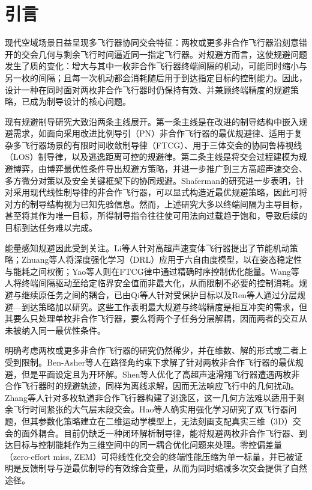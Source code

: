 \section{引言}
现代空域场景日益呈现多飞行器协同交会特征：两枚或更多非合作飞行器沿刻意错开的交会几何与剩余飞行时间逼近同一指定飞行器\cite{yan2020b,shalumov2019}。对规避方而言，这使规避问题发生了质的变化：增大与其中一枚非合作飞行器终端间隔的机动，可能同时缩小与另一枚的间隔；且每一次机动都会消耗随后用于到达指定目标的控制能力。因此，设计一种在同时面对两枚非合作飞行器时仍保持有效、并兼顾终端精度的规避策略，已成为制导设计的核心问题。

现有规避制导研究大致沿两条主线展开。第一条主线是在改进的制导结构中嵌入规避需求，如面向采用改进比例导引（PN）非合作飞行器的最优规避律\cite{feng2023}、适用于复杂多飞行器场景的有限时间收敛制导律（FTCG）\cite{ding2024}、用于三体交会的协同鲁棒视线（LOS）制导律\cite{luo2023}，以及逃逸距离可控的规避律\cite{yu2023}。第二条主线是将交会过程建模为规避博弈，由博弈最优性条件导出规避方策略\cite{turetsky2003}，并进一步推广到三方高超声速交会\cite{yan2020a}、多方微分对策\cite{liang2022}以及安全关键框架下的协同规避\cite{chen2024}。Shaferman的研究进一步表明，针对采用现代线性制导律的非合作飞行器，可以显式构造近最优规避策略\cite{shaferman2021}，因此可将对方的制导结构视为已知先验信息。然而，上述研究大多以终端间隔为主导目标，甚至将其作为唯一目标，所得制导指令往往使可用法向过载趋于饱和，导致后续的目标到达任务难以完成。

能量感知规避因此受到关注。Li等人针对高超声速变体飞行器提出了节能机动策略\cite{li2024cja}；Zhuang等人将深度强化学习（DRL）应用于六自由度模型，以在姿态稳定性与能耗之间权衡\cite{zhuang2024}；Yao等人则在FTCG律中通过精确时序控制优化能量\cite{yao2024}。Wang等人将终端间隔驱动至给定临界安全值而非最大化，从而限制不必要的控制消耗\cite{wang2024}。规避与继续原任务之间的耦合，已由Qi等人针对受保护目标\cite{qi2017}以及Ren等人通过分层规避—到达策略\cite{ren2025}加以研究。这些工作表明最大规避与终端精度是相互冲突的需求，但其要么只处理单枚非合作飞行器，要么将两个子任务分层解耦，因而两者的交互从未被纳入同一最优性条件。

明确考虑两枚或更多非合作飞行器的研究仍然稀少，并在维数、解的形式或二者上受到限制。Ben-Asher等人在路径角约束下求解了针对两枚非合作飞行器的最优规避，但是平面设定且为开环解\cite{benasher1988}。Shen等人优化了高超声速滑翔飞行器遭遇两枚非合作飞行器时的规避轨迹，同样为离线求解，因而无法响应飞行中的几何扰动\cite{shen2022}。Zhang等人针对多枚轨道非合作飞行器构建了逃逸区，这一几何方法难以适用于剩余飞行时间紧张的大气层末段交会\cite{zhang2023}。Hao等人确实用强化学习研究了双飞行器问题，但其参数化策略建立在二维运动学模型上，无法刻画支配真实三维（3D）交会的面外耦合\cite{hao2025}。目前仍缺乏一种闭环解析制导律，能将规避两枚非合作飞行器、到达目标与控制能耗作为三维空间中的同一耦合优化问题来处理。零控偏差量（zero-effort miss, ZEM）可将线性化交会的终端性能压缩为单一标量\cite{zarchan2019}，并已被证明是反馈制导\cite{guo2013}与逆最优制导\cite{ma2022}的有效综合变量，从而为同时缩减多次交会提供了自然途径。

